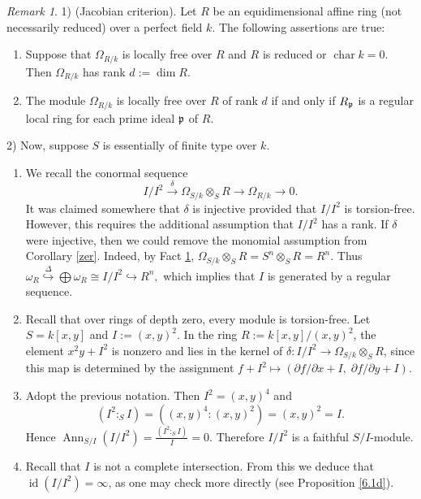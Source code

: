\documentclass[10. pt,a4paper]{amsart}
\theoremstyle{definition}
\theoremstyle{remark}
\newtheorem{remark}[theorem]{Remark}\newtheorem{fact}[theorem]{Fact}
\newcommand{\id}{\operatorname{id}}
\newcommand{\fp}{\frak{p}}
\begin{document}
\begin{remark}\label{e}
1)	(Jacobian criterion). Let $R$ be an equidimensional affine ring (not necessarily reduced) over a perfect field $k$. The following assertions are true:
	\begin{enumerate}
		\item[(i)] Suppose that $\Omega_{R/k}$ is locally free over $R$ and $R$ is reduced or $\operatorname{char} k = 0$. Then $\Omega_{R/k}$ has rank $d := \dim R$.
		\item[(ii)] The module $\Omega_{R/k}$ is locally free over $R$ of rank $d$ if and only if $R_{\fp}$ is a regular local ring for each prime ideal $\fp$ of $R$.
	\end{enumerate}
	
	
2) Now, suppose $S$ is essentially of finite type over $k$.
	\begin{enumerate}
		\item[(i)] We recall the conormal sequence
		\[
		I/I^2 \stackrel{\delta}{\longrightarrow} \Omega_{S/k} \otimes_S R \longrightarrow \Omega_{R/k} \longrightarrow 0.
		\]
		It was claimed somewhere that $\delta$ is injective provided that $I/I^2$ is torsion-free. However, this requires the additional assumption that $I/I^2$ has a rank. If $\delta$ were   injective, then we could remove the monomial assumption from Corollary \ref{zer}. Indeed, by Fact \ref{e}, $\Omega_{S/k} \otimes_S R = S^n \otimes_S R = R^n$. Thus
		\(
		\omega_R \stackrel{\Delta}{\hookrightarrow} \bigoplus \omega_R \cong I/I^2 \hookrightarrow R^n,
		\)
		which implies that $I$ is generated by a regular sequence.
		
		\item[(ii)] Recall that over rings of depth zero, every module is torsion-free. Let $S = k[x,y]$ and $I := (x,y)^2$. In the ring $R := k[x,y]/(x,y)^2$, the element $x^2y + I^2$ is nonzero and lies in the kernel of $\delta : I/I^2 \to \Omega_{S/k} \otimes_S R$, since this map is determined by the assignment $f + I^2 \mapsto (\partial f/\partial x + I,\; \partial f/\partial y + I)$.
		
		\item[(iii)] Adopt the previous notation. Then $I^2 = (x,y)^4$ and
		\[
		(I^2 :_S I) = ((x,y)^4 : (x,y)^2) = (x,y)^2 = I.
		\]
		Hence $\operatorname{Ann}_{S/I}(I/I^2) = \frac{(I^2 :_S I)}{I} = 0$. Therefore $I/I^2$ is a faithful $S/I$-module.
		
		\item[(iv)] Recall that $I$ is not a complete intersection. From this we deduce that $\id(I/I^2) = \infty$, as one may check more directly (see Proposition \ref{6.1d}).
	\end{enumerate}


\end{remark}
\end{document}

